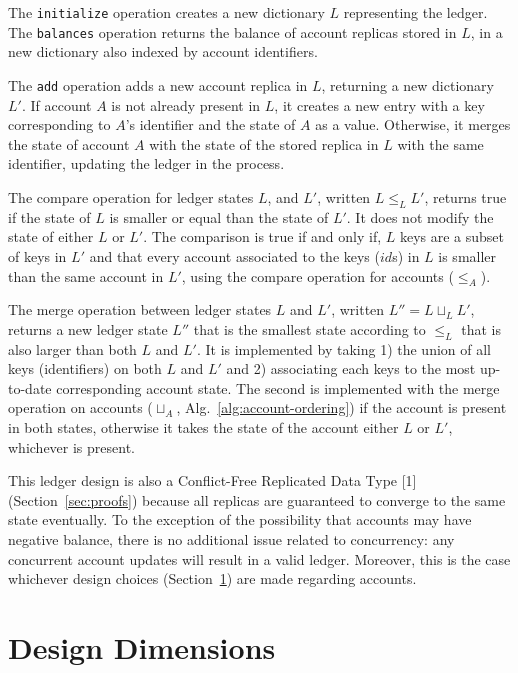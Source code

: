 \documentclass[9pt, oneside]{article}   	%
\begin{document}
The \texttt{initialize} operation creates a new dictionary $L$ representing the ledger. The \texttt{balances} operation returns the balance of account replicas stored in $L$, in a new dictionary also indexed by account identifiers. 

The \texttt{add} operation adds a new account replica in $L$, returning a new dictionary $L'$. If account $A$ is not already present in $L$, it creates a new entry with a key corresponding to $A$'s identifier and the state of $A$ as a value. Otherwise, it merges the state of account $A$ with the state of the stored replica in $L$ with the same identifier, updating the ledger in the process.

The compare operation for ledger states $L$, and $L'$, written $L \leq_L L'$, returns true if the state of $L$ is smaller or equal than the state of $L'$. It does not modify the state of either $L$ or $L'$. The comparison is true if and only if, $L$ keys are a subset of keys in $L'$ and that every account associated to the keys ($id$s) in $L$ is smaller than the same account in $L'$, using the compare operation for accounts ($\leq_A$).

The merge operation between ledger states $L$ and $L'$, written $L'' = L \sqcup_L L'$, returns a new ledger state $L''$ that is the smallest state according to $\leq_L$ that is also larger than both $L$ and $L'$. It is implemented by taking 1) the union of all keys (identifiers) on both $L$ and $L'$ and 2) associating each keys to the most up-to-date corresponding account state. The second is implemented with the merge operation on accounts ($\sqcup_A$, Alg.~\ref{alg:account-ordering}) if the account is present in both states, otherwise it takes the state of the account either $L$ or $L'$, whichever is present.


This ledger design is also a Conflict-Free Replicated Data Type [1] (Section~\ref{sec:proofs}) because all replicas are guaranteed to converge to the same state eventually. To the exception of the possibility that accounts may have negative balance, there is no additional issue related to concurrency: any concurrent account updates will result in a valid ledger. Moreover, this is the case whichever design choices (Section~\ref{sec:design-issues}) are made regarding accounts.


\section{Design Dimensions}
\label{sec:design-issues}
\end{document}
